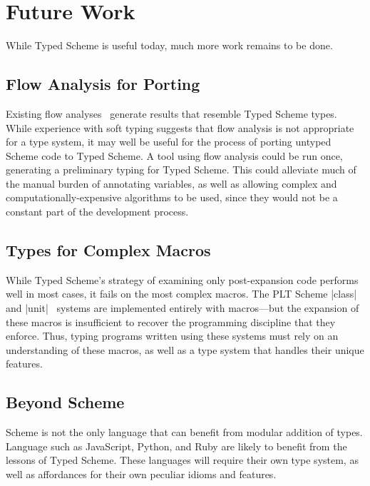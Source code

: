 \section{Future Work}

While Typed Scheme is useful today, much more work remains to be done.  

\subsection{Flow Analysis for Porting}

Existing flow analyses~\cite{shivers-thesis,ff:toplas99} generate
results that resemble Typed Scheme types.  While experience with soft
typing suggests that flow analysis is not appropriate for a type
system, it may well be useful for the process of porting untyped
Scheme code to Typed Scheme.  A tool using flow analysis could be run
once, generating a preliminary typing for Typed Scheme.  This could
alleviate much of the manual burden of annotating variables, as well
as allowing complex and computationally-expensive algorithms to be
used, since they would not be a constant part of the development
process.  

\subsection{Types for Complex Macros}

While Typed Scheme's strategy of examining only post-expansion code
performs well in most cases, it fails on the most complex macros.  The
PLT Scheme \scheme|class|~\cite{fff:classes} and
\scheme|unit|~\cite{ff:units} systems are implemented entirely with
macros---but the expansion of these macros is insufficient to recover
the programming discipline that they enforce.  Thus, typing programs
written using these systems must rely on an understanding of these
macros, as well as a type system that handles their unique features.  

\subsection{Beyond Scheme}

Scheme is not the only language that can benefit from modular addition
of types.  Language such as JavaScript, Python, and Ruby are likely to
benefit from the lessons of Typed Scheme.  These languages will
require their own type system, as well as affordances for their own
peculiar idioms and features.  